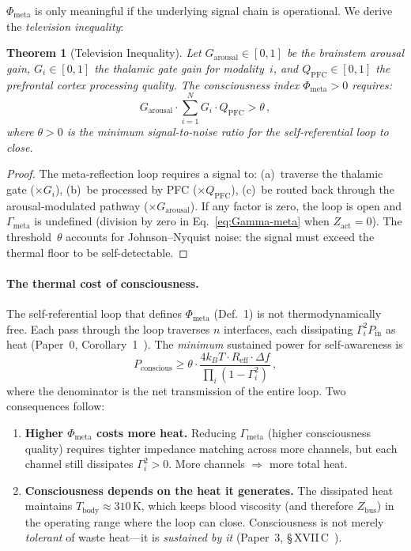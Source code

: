 \documentclass[aps,pre,twocolumn,superscriptaddress,floatfix]{revtex4-2}
\newtheorem{theorem}{Theorem}
\newcommand{\Gmeta}{\Gamma_{\text{meta}}}
\newcommand{\Phimeta}{\Phi_{\text{meta}}}
\newcommand{\Zarousal}{G_{\text{arousal}}}
\newcommand{\QPFC}{Q_{\text{PFC}}}
\begin{document}
$\Phimeta$ is only meaningful if the underlying signal chain
is operational.  We derive the \emph{television inequality}:

\begin{theorem}[Television Inequality]
\label{thm:television}
Let $\Zarousal\in[0,1]$ be the brainstem arousal gain,
$G_i\in[0,1]$ the thalamic gate gain for modality~$i$,
and $\QPFC\in[0,1]$ the prefrontal cortex processing
quality.  The consciousness index $\Phimeta>0$ requires:
\begin{equation}
  \Zarousal \cdot \sum_{i=1}^{N} G_i \cdot \QPFC > \theta\,,
  \label{eq:TV-inequality}
\end{equation}
where $\theta>0$ is the minimum signal-to-noise ratio for
the self-referential loop to close.
\end{theorem}

\begin{proof}
The meta-reflection loop requires a signal to:
(a)~traverse the thalamic gate ($\times G_i$),
(b)~be processed by PFC ($\times\QPFC$),
(c)~be routed back through the arousal-modulated pathway
($\times\Zarousal$).
If any factor is zero, the loop is open and $\Gmeta$ is
undefined (division by zero in Eq.~\ref{eq:Gamma-meta}
when $Z_{\text{act}}=0$).
The threshold~$\theta$ accounts for Johnson--Nyquist noise:
the signal must exceed the thermal floor to be self-detectable.
\end{proof}

\paragraph{The thermal cost of consciousness.}
The self-referential loop that defines $\Phimeta$ (Def.~1)
is not thermodynamically free.  Each pass through the loop
traverses $n$ interfaces, each dissipating
$\Gamma_i^2 P_{\mathrm{in}}$ as heat
(Paper~0, Corollary~1~\cite{Paper0}).
The \emph{minimum} sustained power for self-awareness is
\begin{equation}
  P_{\mathrm{conscious}} \geq
  \theta \cdot \frac{4 k_B T \cdot R_{\mathrm{eff}} \cdot \Delta f}
  {\prod_i (1 - \Gamma_i^2)}\,,
  \label{eq:P-conscious}
\end{equation}
where the denominator is the net transmission of the
entire loop.  Two consequences follow:
\begin{enumerate}
  \item \textbf{Higher $\Phimeta$ costs more heat.}
    Reducing $\Gmeta$ (higher consciousness quality)
    requires tighter impedance matching across more
    channels, but each channel still dissipates
    $\Gamma_i^2 > 0$.  More channels $\Rightarrow$
    more total heat.
  \item \textbf{Consciousness depends on the heat it
    generates.}  The dissipated heat maintains
    $T_{\mathrm{body}} \approx 310$\,K, which keeps
    blood viscosity (and therefore $Z_{\mathrm{bus}}$)
    in the operating range where the loop can close.
    Consciousness is not merely \emph{tolerant} of
    waste heat---it is \emph{sustained by it}
    (Paper~3, \S\,XVII\,C~\cite{Paper3}).
\end{enumerate}
\end{document}
